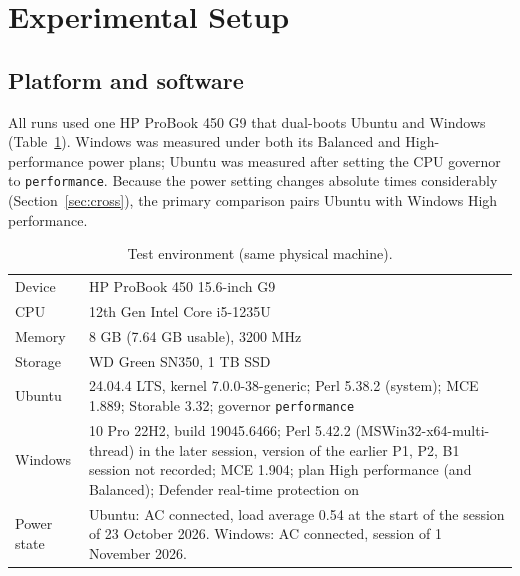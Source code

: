 \documentclass[conference]{IEEEtran}
\begin{document}
\section{Experimental Setup}
\subsection{Platform and software}
All runs used one HP ProBook 450 G9 that dual-boots Ubuntu and Windows (Table~\ref{tab:env}). Windows was measured under both its Balanced and High-performance power plans; Ubuntu was measured after setting the CPU governor to \texttt{performance}. Because the power setting changes absolute times considerably (Section~\ref{sec:cross}), the primary comparison pairs Ubuntu with Windows High performance.

\begin{table}[t]
\caption{Test environment (same physical machine).}
\label{tab:env}
\centering\small
\begin{tabular}{@{}p{}p{}@{}}
\toprule
Device & HP ProBook 450 15.6-inch G9 \\
CPU & 12th Gen Intel Core i5-1235U \\
Memory & 8 GB (7.64 GB usable), 3200 MHz \\
Storage & WD Green SN350, 1 TB SSD \\
Ubuntu & 24.04.4 LTS, kernel 7.0.0-38-generic; Perl 5.38.2 (system); MCE 1.889; Storable 3.32; governor \texttt{performance} \\
Windows & 10 Pro 22H2, build 19045.6466; Perl 5.42.2 (MSWin32-x64-multi-thread) in the later session, version of the earlier P1, P2, B1 session not recorded; MCE 1.904; plan High performance (and Balanced); Defender real-time protection on \\
Power state & Ubuntu: AC connected, load average 0.54 at the start of the session of 23 October 2026. Windows: AC connected, session of 1 November 2026. \\
\bottomrule
\end{tabular}
\end{table}
\end{document}

